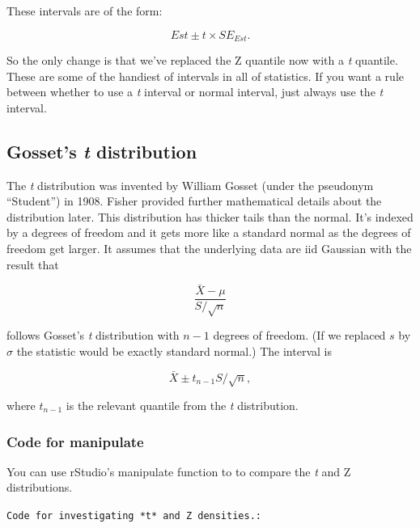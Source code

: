 \documentclass[]{article}
\begin{document}
These intervals are of the form:

\[Est \pm t \times SE_{Est}.\]

So the only change is that we've replaced the Z quantile now with a
\emph{t} quantile. These are some of the handiest of intervals in all of
statistics. If you want a rule between whether to use a \emph{t}
interval or normal interval, just always use the \emph{t} interval.

\subsection{Gosset's \emph{t}
distribution}\label{gossets-t-distribution}

The \emph{t} distribution was invented by William Gosset (under the
pseudonym ``Student'') in 1908. Fisher provided further mathematical
details about the distribution later. This distribution has thicker
tails than the normal. It's indexed by a degrees of freedom and it gets
more like a standard normal as the degrees of freedom get larger. It
assumes that the underlying data are iid Gaussian with the result that

\[
\frac{\bar X - \mu}{S/\sqrt{n}}
\]

follows Gosset's \emph{t} distribution with $n-1$ degrees of freedom.
(If we replaced $s$ by $\sigma$ the statistic would be exactly standard
normal.) The interval is

\[\bar X \pm t_{n-1} S/\sqrt{n},\]

where $t_{n-1}$ is the relevant quantile from the \emph{t} distribution.

\subsubsection{Code for manipulate}\label{code-for-manipulate}

You can use rStudio's manipulate function to to compare the \emph{t} and
Z distributions.

\vspace{1pc}

\verb;Code for investigating *t* and Z densities.:;
\end{document}
